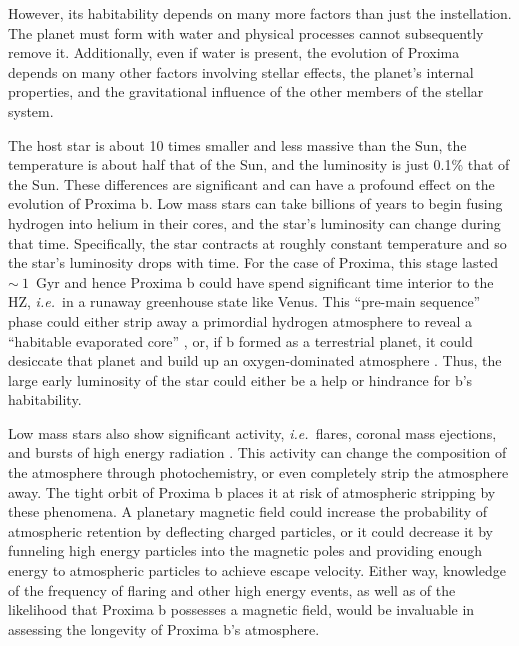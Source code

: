 \documentclass[preprint,12pt]{aastex}
\def\eg{{\it e.g.\ }}
\def\ie{{\it i.e.\ }}
\begin{document}
However, its habitability depends on many more factors than just the
instellation. The planet must form with water and physical processes
cannot subsequently remove it. Additionally, even if water is present,
the evolution of Proxima depends on many other factors involving
stellar effects, the planet's internal properties, and the
gravitational influence of the other members of the stellar system.

The host star is about 10 times smaller and less massive than the Sun,
the temperature is about half that of the Sun, and the luminosity is
just 0.1\% that of the Sun. These differences are significant and can
have a profound effect on the evolution of Proxima b. Low mass stars
can take billions of years to begin fusing hydrogen into helium in
their cores, and the star's luminosity can change during that
time. Specifically, the star contracts at roughly constant temperature and so
the star's luminosity drops with time. For the case of Proxima, this
stage lasted $\sim~1$~Gyr \citep{Baraffe15} and hence Proxima b
could have spend significant time interior to the HZ, \ie in a runaway
greenhouse state like Venus. This ``pre-main sequence'' phase could
either strip away a primordial hydrogen atmosphere to reveal a
``habitable evaporated core'' \citep{Luger15}, or, if b formed as a
terrestrial planet, it could desiccate that planet and build up an
oxygen-dominated atmosphere \citep{LugerBarnes15}. Thus, the large
early luminosity of the star could either be a help or hindrance for
b's habitability.

Low mass stars also show significant activity, \ie flares, coronal
mass ejections, and bursts of high energy radiation
\citep[\eg][]{West08}. This activity can change the composition of the
atmosphere through photochemistry, or even completely strip the
atmosphere away. The tight orbit of Proxima b places it at risk of
atmospheric stripping by these phenomena. A planetary magnetic field
could increase the probability of atmospheric retention by deflecting
charged particles, or it could decrease it by funneling high energy
particles into the magnetic poles and providing enough energy to
atmospheric particles to achieve escape velocity. Either way, knowledge of the
frequency of flaring and other high energy events, as well as of the
likelihood that Proxima b possesses a magnetic field, would be
invaluable in assessing the longevity of Proxima b's atmosphere.
\end{document}
